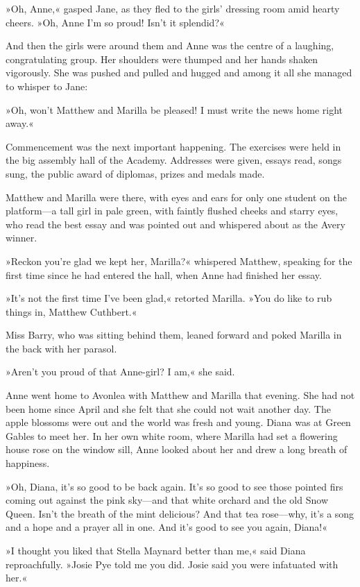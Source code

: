 »Oh, Anne,« gasped Jane, as they fled to the girls' dressing room amid hearty cheers. »Oh, Anne I'm so proud! Isn't it splendid?«

And then the girls were around them and Anne was the centre of a laughing, congratulating group. Her shoulders were thumped and her hands shaken vigorously. She was pushed and pulled and hugged and among it all she managed to whisper to Jane:

»Oh, won't Matthew and Marilla be pleased! I must write the news home right away.«

Commencement was the next important happening. The exercises were held in the big assembly hall of the Academy. Addresses were given, essays read, songs sung, the public award of diplomas, prizes and medals made.

Matthew and Marilla were there, with eyes and ears for only one student on the platform—a tall girl in pale green, with faintly flushed cheeks and starry eyes, who read the best essay and was pointed out and whispered about as the Avery winner.

»Reckon you're glad we kept her, Marilla?« whispered Matthew, speaking for the first time since he had entered the hall, when Anne had finished her essay.

»It's not the first time I've been glad,« retorted Marilla. »You do like to rub things in, Matthew Cuthbert.«

Miss Barry, who was sitting behind them, leaned forward and poked Marilla in the back with her parasol.

»Aren't you proud of that Anne-girl? I am,« she said.

Anne went home to Avonlea with Matthew and Marilla that evening. She had not been home since April and she felt that she could not wait another day. The apple blossoms were out and the world was fresh and young. Diana was at Green Gables to meet her. In her own white room, where Marilla had set a flowering house rose on the window sill, Anne looked about her and drew a long breath of happiness.

»Oh, Diana, it's so good to be back again. It's so good to see those pointed firs coming out against the pink sky—and that white orchard and the old Snow Queen. Isn't the breath of the mint delicious? And that tea rose—why, it's a song and a hope and a prayer all in one. And it's good to see you again, Diana!«

»I thought you liked that Stella Maynard better than me,« said Diana reproachfully. »Josie Pye told me you did. Josie said you were infatuated with her.«

